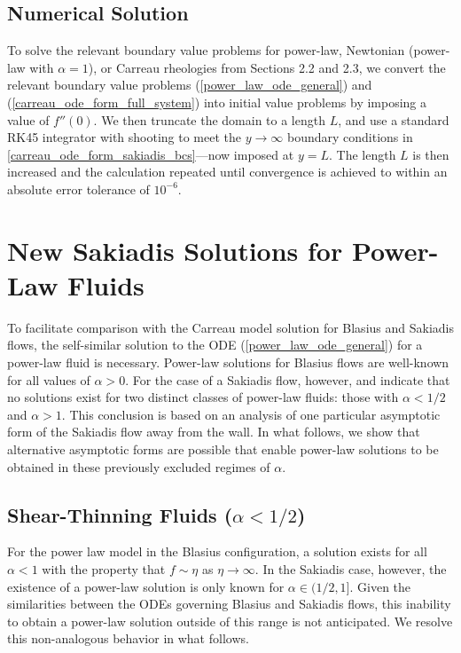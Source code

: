 \documentclass[lineno]{JFM-FLM_Au}
\begin{document}
\subsection{Numerical Solution}

\hspace{\parindent} To solve the relevant boundary value problems for power-law, Newtonian (power-law with $\alpha=1$), or Carreau rheologies from Sections 2.2 and 2.3, we convert the relevant boundary value problems (\ref{power_law_ode_general}) and (\ref{carreau_ode_form_full_system}) into initial value problems by imposing a value of $f''(0)$.  We then truncate the domain to a length $L$, and use a standard RK45 integrator with shooting to meet the $y\to\infty$ boundary conditions in \eqref{carreau_ode_form_sakiadis_bcs}---now imposed at $y=L$. The length $L$ is then increased and the calculation repeated until convergence is achieved to within an absolute error tolerance of $10^{-6}$.

\section{New Sakiadis Solutions for Power-Law Fluids}

\hspace{\parindent} To facilitate comparison with the Carreau model solution for Blasius and Sakiadis flows, the self-similar solution to the ODE (\ref{power_law_ode_general}) for a power-law fluid is necessary. Power-law solutions for Blasius flows are well-known for all values of $\alpha>0$. For the case of a Sakiadis flow, however, \citet{Fox} and \citet{NonNewtonian} indicate that no solutions exist for two distinct classes of power-law fluids: those with $\alpha < 1/2$ and $\alpha > 1$. This conclusion is based on an analysis of one particular asymptotic form of the Sakiadis flow away from the wall. In what follows, we show that alternative asymptotic forms are possible that enable power-law solutions to be obtained in these previously excluded regimes of $\alpha$.

\subsection{Shear-Thinning Fluids ($\alpha < 1/2$)}


\hspace{\parindent} For the power law model in the Blasius configuration, a solution exists for all $\alpha < 1$ with the property that $f \sim \eta$ as $\eta \to \infty$. In the Sakiadis case, however, the existence of a power-law solution is only known for $\alpha \in (1/2, 1]$.  Given the similarities between the ODEs governing Blasius and Sakiadis flows, this inability to obtain a power-law solution outside of this range is not anticipated.  We resolve this non-analogous behavior in what follows.
\end{document}
